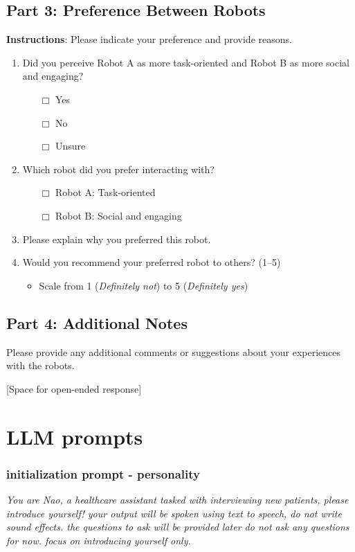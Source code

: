\documentclass[runningheads]{llncs}
\begin{document}
\subsection*{Part 3: Preference Between Robots}

\textbf{Instructions}: Please indicate your preference and provide reasons.

\begin{enumerate}
    \item Did you perceive Robot A as more task-oriented and Robot B as more social and engaging?
    \begin{itemize}
        \item [$\Box$] Yes
        \item [$\Box$] No
        \item [$\Box$] Unsure
    \end{itemize}
    \item Which robot did you prefer interacting with?
    \begin{itemize}
        \item [$\Box$] Robot A: Task-oriented
        \item [$\Box$] Robot B: Social and engaging
    \end{itemize}
    \item Please explain why you preferred this robot.
    \item Would you recommend your preferred robot to others? \dotfill \underline{\hspace{2cm}} (1--5)
    \begin{itemize}
        \item Scale from 1 (\textit{Definitely not}) to 5 (\textit{Definitely yes})
    \end{itemize}
\end{enumerate}

\subsection*{Part 4: Additional Notes}

Please provide any additional comments or suggestions about your experiences with the robots.

\bigskip

[Space for open-ended response]
\section{LLM prompts}
\subsubsection{initialization prompt - personality}
\textit{You are Nao, a healthcare assistant tasked with interviewing new patients, please introduce yourself! your output will be spoken using text to speech, do not write sound effects. the questions to ask will be provided later do not ask any questions for now. focus on introducing yourself only.}
\end{document}
